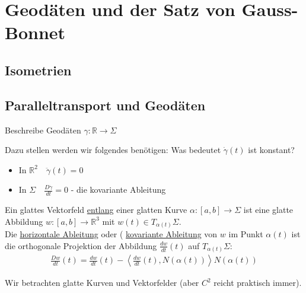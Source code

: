 \documentclass[../main.tex]{subfiles}
\begin{document}
\chapter{Geodäten und der Satz von Gauss-Bonnet}

\section{Isometrien}
\section{Paralleltransport und Geodäten}

\begin{goal}
Beschreibe Geodäten $\gamma : \mathbb{R} \to \Sigma$
\end{goal}

\begin{question}
Dazu stellen werden wir folgendes benötigen: Was bedeutet $\dot{\gamma}(t)$ ist konstant?
\begin{itemize}
    \item In $\mathbb{R}^2 \quad \ddot{\gamma}(t)=0$
    \item In $\Sigma \quad \frac{D\dot{\gamma}}{dt}=0$ - die kovariante Ableitung
\end{itemize}
\end{question}

\begin{definition}
Ein glattes Vektorfeld \underline{entlang} einer glatten Kurve $\alpha : [a,b] \to \Sigma$ ist eine glatte Abbildung $w : [a,b] \to \mathbb{R}^3$ mit $w(t) \in T_{\alpha(t)}\Sigma$. \\
Die \underline{horizontale Ableitung} oder ( \underline{kovariante Ableitung} von $w$ im Punkt $\alpha(t)$ ist die orthogonale Projektion der Abbildung $\frac{dw}{dt}(t)$ auf $T_{\alpha(t)}\Sigma :$
\begin{align*}
    \frac{Dw}{dt}(t) = \frac{dw}{dt}(t) - \left\langle \frac{dw}{dt}(t), N(\alpha(t))\right\rangle N(\alpha(t))
\end{align*}
\end{definition}

\begin{remark}
Wir betrachten glatte Kurven und Vektorfelder (aber $C^2$ reicht praktisch immer).
\end{remark}
\end{document}
